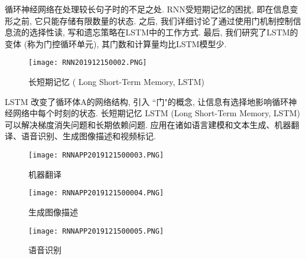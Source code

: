循环神经网络在处理较长句子时的不足之处. RNN受短期记忆的困扰, 即在信息变形之前, 它只能存储有限数量的状态.
之后, 我们详细讨论了通过使用门机制控制信息流的选择性读, 写和遗忘策略在LSTM中的工作方式. 最后, 我们研究了LSTM的变体 (称为门控循环单元), 其门数和计算量均比LSTM模型少.
\begin{figure}[H]
    \centering
    \texttt{[image: RNN201912150002.PNG]}
    \caption{长短期记忆 ( Long Short-Term Memory, LSTM)}
    \label{RNN201912150002}
    \vspace{-0.4cm}
\end{figure}
LSTM 改变了循环体A的网络结构, 引入 ``门"的概念, 让信息有选择地影响循环神经网络中每个时刻的状态.
长短期记忆 LSTM (Long Short-Term Memory, LSTM)可以解决梯度消失问题和长期依赖问题.
应用在诸如语言建模和文本生成、机器翻译、语音识别、生成图像描述和视频标记.
\begin{figure}[H]
    \centering
    \texttt{[image: RNNAPP2019121500003.PNG]}
    \caption{机器翻译}
    \label{RNNAPP2019121500003}
    \vspace{-0.4cm}
\end{figure}
\begin{figure}[H]
    \centering
    \texttt{[image: RNNAPP2019121500004.PNG]}
    \caption{生成图像描述}
    \label{RNNAPP2019121500005}
    \vspace{-0.4cm}
\end{figure}
\begin{figure}[H]
    \centering
    \texttt{[image: RNNAPP2019121500005.PNG]}
    \caption{语音识别}
    \label{RNNAPP2019121500005}
    \vspace{-0.4cm}
\end{figure}
